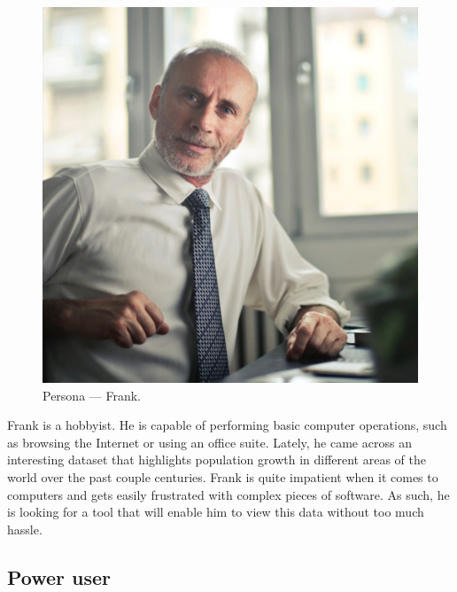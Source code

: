 \documentclass[thesis=M,english,hidelinks]{FITthesisXE}[2012/06/26]
\begin{document}
\begin{figure}[ht]
\centering
\includegraphics[scale=0.15]{persona_frank}
\caption{Persona --- Frank.}
\label{fig:persona_frank}
\end{figure}

Frank is a hobbyist. He is capable of performing basic computer operations, such as browsing the Internet or using an office suite. Lately, he came across an interesting dataset that highlights population growth in different areas of the world over the past couple centuries. Frank is quite impatient when it comes to computers and gets easily frustrated with complex pieces of software. As such, he is looking for a tool that will enable him to view this data without too much hassle.

\subsection{Power user}
\end{document}
